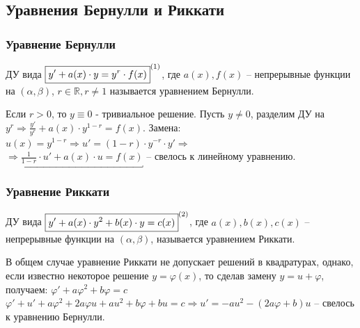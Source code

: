 \subsection{Уравнения Бернулли и Риккати}
\subsubsection{Уравнение Бернулли}

\begin{definition}
    ДУ вида $ \boxed{y' + a(x)\cdot y = y^r \cdot f(x)}^{\eqnum\label{eq:Ber}} $, где $a(x), f(x)$ -- непрерывные функции на $(\alpha, \beta)$, $r \in \mathbb{ R }, r \neq 1$ называется уравнением Бернулли. \\
\end{definition}

\begin{proposition} %
    Если $ r > 0 $, то $ y \equiv 0 $ - тривиальное решение. Пусть $ y \neq 0$, разделим ДУ на $ y^r \Rightarrow \frac{ y' }{ y^r } + a(x) \cdot y^{ 1-r } = f(x).$ Замена: $ u(x) = y^{ 1-r } \Rightarrow u' = ( 1-r ) \cdot y^{ -r } \cdot y' \Rightarrow$ \\ $\Rightarrow \underbracket{ \frac{ 1 }{ 1-r } \cdot u' + a(x)\cdot u = f(x) }$ -- свелось к линейному уравнению. 
\end{proposition}

\subsubsection{Уравнение Риккати}

\begin{definition}
    ДУ вида $ \boxed{y' + a(x) \cdot y^2 + b(x) \cdot y = c(x)}^{\eqnum\label{eq:Ric}} $, где $a(x), b(x), c(x)$ -- непрерывные функции на $(\alpha, \beta)$, называется уравнением Риккати. 
\end{definition}

\begin{proposition}	
    В общем случае уравнение Риккати не допускает решений в квадратурах, однако, если известно некоторое решение $ y = \varphi (x) $, то сделав замену $ y = u + \varphi $, получаем: $ \varphi' + a \varphi^2 + b\varphi = c $ \\ $ \varphi' + u' + a \varphi^2 + 2 a\varphi u + au^2 + b\varphi + bu = c \Rightarrow u' = - au^2 - (2a\varphi + b)u $ -- свелось к уравнению Бернулли.
\end{proposition}

